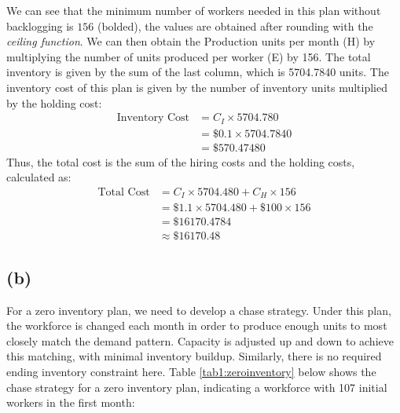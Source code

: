 \documentclass[12pt]{article}
\begin{document}
\noindent We can see that the minimum number of workers needed in this plan without backlogging is $156$ (bolded), the values are obtained after rounding with the \textit{ceiling function}. We can then obtain the Production units per month (H) by multiplying the number of units produced per worker (E) by 156. The total inventory is given by the sum of the last column, which is 5704.7840 units. The inventory cost of this plan is given by the number of inventory units multiplied by the holding cost: \begin{align*}
    \text{Inventory Cost} &= C_I \times 5704.780 \\ 
    &= \$ 0.1 \times 5704.7840 \\ 
    &= \boxed{\$ 570.47480}
\end{align*} Thus, the total cost is the sum of the hiring costs and the holding costs, calculated as: \begin{align*}
    \text{Total Cost} &= C_I \times 5704.480 + C_H \times 156 \\ 
    &= \$ 1.1 \times 5704.480 + \$ 100 \times 156 \\ 
    &= \$ 16170.4784 \\ 
    &\approx \boxed{\$ 16170.48}
\end{align*}

\subsection*{(b)}   

For a zero inventory plan, we need to develop a chase strategy. Under this plan, the workforce is changed each month in order to produce enough units to most closely match the demand pattern. Capacity is adjusted up and down to achieve this matching, with minimal inventory buildup. Similarly, there is no required ending inventory constraint here. Table \ref{tab1:zeroinventory} below shows the chase strategy for a zero inventory plan, indicating a workforce with 107 initial workers in the first month:
\end{document}
